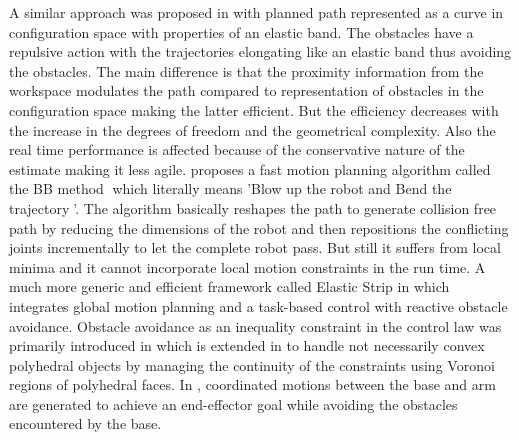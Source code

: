 A similar approach was proposed in \cite{quinlan1993elastic} with planned path represented as a curve in configuration space with properties of an elastic band. The obstacles have a repulsive action with the trajectories elongating like an elastic band thus avoiding the obstacles. The main difference is that the proximity information from the workspace modulates the path compared to representation of obstacles in the configuration space making the latter efficient. But the efficiency decreases with the increase in the degrees of freedom and the geometrical complexity. Also the real time performance is affected because of the conservative nature of the estimate making it less agile.  \cite{baginski1998motion} proposes a fast motion planning algorithm called the BB method which literally means 'Blow up the robot and Bend the trajectory'. The algorithm basically reshapes the path to generate collision free path by reducing the dimensions of the robot and then repositions the conflicting joints incrementally to let the complete robot pass. But still it suffers from local minima and it cannot incorporate local motion constraints in the run time. A much more generic and efficient framework called Elastic Strip in \cite{brock2002elastic} which integrates global motion planning and a task-based control with reactive obstacle avoidance. Obstacle avoidance as an inequality constraint in the control law was primarily introduced in \cite{Faverjon1987} which is extended in \cite{Kanehiro-RSS08} to handle not necessarily convex polyhedral objects by managing the continuity of the constraints using Voronoi regions of polyhedral faces.  In \cite{ogren2000reactive}, coordinated motions between the base and arm are generated to achieve an end-effector goal while avoiding the obstacles encountered by the base.

